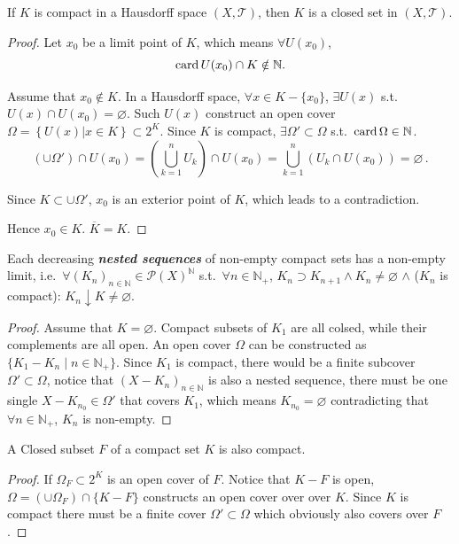 \documentclass[openany]{book}
\begin{document}
\begin{theorem}\label{theorem: compact sets are closed in Hausdorff space}
	If $K$ is compact in a Hausdorff space $(X, \mathscr T)$, then $K$ is a closed set in $(X, \mathscr T)$.
\end{theorem}
\begin{proof}
	Let $x_0$ be a limit point of $K$, which means $\forall U(x_0)$, 
	\[
		\operatorname{card} U(x_0)\cap K \notin \mathbb{N}.
	\]

	Assume that $x_0 \notin K$. 
	In a Hausdorff space, $\forall x \in K - \{x_0\}$, $\exists U(x)$ s.t. $U(x)\cap U(x_0)=\varnothing$. 
	Such $U(x)$ construct an open cover $\varOmega=\left\{U(x)|x\in K \right\}\subset 2^K$. 
	Since $K$ is compact, $\exists \varOmega' \subset \varOmega$ s.t.\ $\operatorname{card} \Omega \in \mathbb{N}$. 
	\[
		\left(\cup\Omega'\right)
		\cap U(x_0)
		=
		\left(\bigcup_{k=1}^n{U_k}\right)
		\cap U(x_0)
		=
		\bigcup_{k=1}^n\left(
			U_k\cap U(x_0)
		\right)
		=
		\varnothing\,.
	\]

	Since $K\subset \cup \Omega'$, $x_0$ is an exterior point of $K$, which leads to a contradiction. 

	Hence $x_0 \in K$. $\overline K = K$.
\end{proof}

\begin{theorem}\label{theorem: compact nested sequences have non-empty limit}
	Each decreasing \emph{\textbf{nested sequences}} of non-empty compact sets has a non-empty limit, i.e.\ 
	$\forall (K_n)_{n \in \mathbb N} \in \mathscr P(X)^\mathbb N$ s.t.\ $\forall n \in \mathbb N_+$, $K_n \supset K_{n+1}\wedge K_n \neq \varnothing$ $\wedge$ ($K_n$ is compact): 
	$K_n \downarrow K \neq \varnothing$.
\end{theorem}
\begin{proof}
	Assume that $K = \varnothing$. 
	Compact subsets of $K_1$ are all colsed, while their complements are all open. An open cover $\varOmega$ can be constructed as $\{K_1 - K_n \mid n \in \mathbb N_+\}$. 
	Since $K_1$ is compact, there would be a finite subcover $\varOmega' \subset \varOmega$, notice that $(X - K_n)_{n \in \mathbb N}$ is also a nested sequence, there must be one single $X - K_{n_0} \in \varOmega'$ that covers $K_1$, which means $K_{n_0} = \varnothing$ contradicting that $\forall n \in \mathbb N_+$, $K_n$ is non-empty.
\end{proof}

\begin{theorem}\label{theorem: closed subset of compact set}
	A Closed subset $F$ of a compact set $K$ is also compact.
\end{theorem}
\begin{proof}
	If $\varOmega_F \subset 2^K$ is an open cover of $F$. 
	Notice that $K - F$ is open, $\varOmega = (\cup \varOmega_F) \cap \{K - F\}$ constructs an open cover over over $K$. 
	Since $K$ is compact there must be a finite cover $\varOmega' \subset \varOmega$ which obviously also covers over $F$.
\end{proof}
\end{document}
